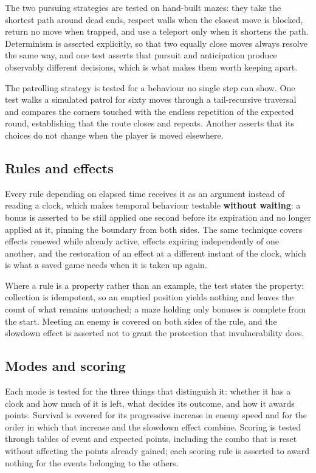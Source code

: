 The two pursuing strategies are tested on hand-built mazes: they take the shortest path around dead ends, respect walls
when the closest move is blocked, return no move when trapped, and use a teleport only when it shortens the path.
Determinism is asserted explicitly, so that two equally close moves always resolve the same way, and one test asserts
that pursuit and anticipation produce observably different decisions, which is what makes them worth keeping apart.

The patrolling strategy is tested for a behaviour no single step can show. One test walks a simulated patrol for sixty
moves through a tail-recursive traversal and compares the corners touched with the endless repetition of the expected
round, establishing that the route closes and repeats. Another asserts that its choices do not change when the player
is moved elsewhere.

\subsection{Rules and effects}

Every rule depending on elapsed time receives it as an argument instead of reading a clock, which makes temporal
behaviour testable \textbf{without waiting}: a bonus is asserted to be still applied one second before its
expiration and no longer applied at it, pinning the boundary from both sides. The same technique covers effects renewed while
already active, effects expiring independently of one another, and the restoration of an effect at a different instant
of the clock, which is what a saved game needs when it is taken up again.

Where a rule is a property rather than an example, the test states the property: collection is idempotent, so an
emptied position yields nothing and leaves the count of what remains untouched; a maze holding only bonuses is complete
from the start. Meeting an enemy is covered on both sides of the rule, and the slowdown effect is asserted not to grant
the protection that invulnerability does.

\subsection{Modes and scoring}

Each mode is tested for the three things that distinguish it: whether it has a clock and how much of it is left, what
decides its outcome, and how it awards points. Survival is covered for its progressive increase in enemy speed and for
the order in which that increase and the slowdown effect combine. Scoring is tested through tables of event and
expected points, including the combo that is reset without affecting the points already gained; each scoring rule is
asserted to award nothing for the events belonging to the others.

